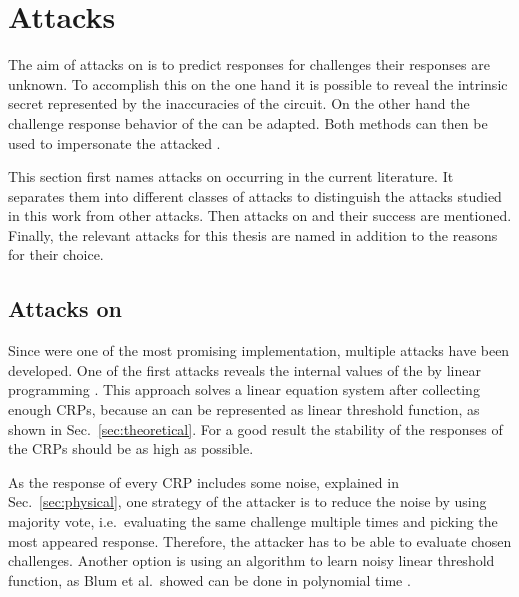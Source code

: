\chapter{Attacks}
\label{cap:attacks}

The aim of attacks on \apuf is to predict responses for challenges their responses are unknown.
To accomplish this on the one hand it is possible to reveal the intrinsic secret represented by the inaccuracies of the \apuf circuit.
On the other hand the challenge response behavior of the \puf can be adapted.
Both methods can then be used to impersonate the attacked \puf.

This section first names attacks on \apufs occurring in the current literature.
It separates them into different classes of attacks to distinguish the attacks studied in this work from other attacks.
Then attacks on \xpufs and their success are mentioned.
Finally, the relevant attacks for this thesis are named in addition to the reasons for their choice.


\section{Attacks on \apufs}
\label{sec:attacksonarbiter}

Since \apufs were one of the most promising \puf implementation, multiple attacks have been developed.
One of the first attacks reveals the internal values of the \apuf by linear programming \cite{Ozturk2008TowardsDevices}.
This approach solves a linear equation system after collecting enough \acp{CRP}, because an \apuf can be represented as linear threshold function, as shown in Sec.\ \ref{sec:theoretical}. %
For a good result the stability of the responses of the \acp{CRP} should be as high as possible.

As the response of every \ac{CRP} includes some noise, explained in Sec.\ \ref{sec:physical}, one strategy of the attacker is to reduce the noise by using majority vote, i.e.\ evaluating the same challenge multiple times and picking the most appeared response.
Therefore, the attacker has to be able to evaluate chosen challenges. %
Another option is using an algorithm to learn noisy linear threshold function, as Blum et al.\ showed can be done in polynomial time \cite{Blum1998AlgorithmicaNoisy}.

